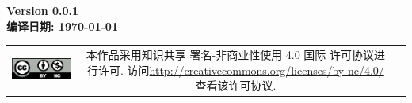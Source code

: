 \documentclass{qbook}
\begin{document}
\pagestyle{empty}
\begin{center}
	\Large{\sffamily\bfseries\heiti Version 0.0.1} \\ \vspace{2em}
	\Large{\sffamily\bfseries\heiti 编译日期: \today} \\ \vspace{1em}
\end{center} 
\vfill
\vspace{30em}
\begin{tabular*}{\textwidth}{ccc}
	\includegraphics{figure/by-nc.eps}
	& \begin{minipage}[b]{0.6\textwidth}
		\small\sffamily
		本作品采用知识共享 署名-非商业性使用 4.0 国际 许可协议进行许可. 访问\url{http://creativecommons.org/licenses/by-nc/4.0/  }查看该许可协议.
	\end{minipage}
\end{tabular*}  
\thispagestyle{empty}
\frontmatter  %
\pagestyle{empty}

\pagestyle{empty}
\tableofcontents
%  
\mainmatter	  %
\pagestyle{fancy}
\setcounter{page}{0}







\backmatter	
\printbibliography[heading=bibintoc]
\makeatletter
\makeatother
\end{document}
